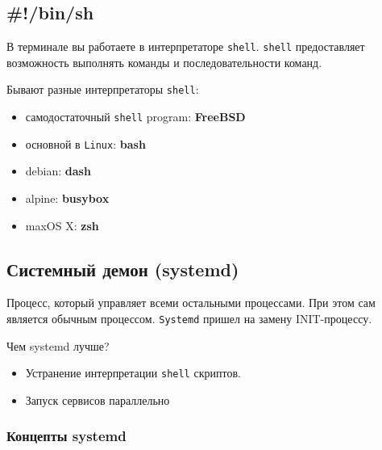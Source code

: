 \begin{multicols}{2}
      \subsection*{\#!/bin/sh}

      В терминале вы работаете в интерпретаторе \texttt{shell}. \texttt{shell} предоставляет возможность выполнять
      команды и последовательности команд.

      Бывают разные интерпретаторы \texttt{shell}:
      \begin{itemize}
        \item самодостаточный \texttt{shell} program: \textbf{FreeBSD}
        \item основной в \texttt{Linux}: \textbf{bash}
        \item debian: \textbf{dash}
        \item alpine: \textbf{busybox}
        \item maxOS X: \textbf{zsh}
      \end{itemize}

      \subsection*{Системный демон (systemd)}
      \begin{definition}{}{}
      Процесс, который управляет всеми остальными процессами. При этом сам является обычным процессом. \texttt{Systemd} пришел на замену INIT-процессу.

      \end{definition}

      Чем systemd лучше?
      \begin{itemize}
        \item Устранение интерпретации \texttt{shell} скриптов. 
        \item Запуск сервисов параллельно
      \end{itemize}

      \subsubsection*{Концепты systemd}


\end{multicols}
